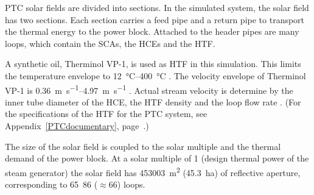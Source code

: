 PTC solar fields are divided into sections. In the simulated system, the solar field has two sections. Each section carries a feed pipe and a return pipe to transport the thermal energy to the power block. Attached to the header pipes are many loops, which contain the SCAs, the HCEs and the HTF. 

A synthetic oil, Therminol VP-1, is used as HTF in this simulation. This limits the temperature envelope to \SIrange{12}{400}{\celsius} \cite{Therminol2015}. The velocity envelope of Therminol VP-1 is \SIrange{0.36}{4.97}{\meter\per\second} \cite{Wagner2014}. Actual stream velocity is determine by the inner tube diameter of the HCE, the HTF density and the loop flow rate \cite{NREL2015a}. (For the specifications of the HTF for the PTC system, see Appendix~\ref{PTCdocumentary}, page~\pageref{PTC_HTF}.) 


The size of the solar field is coupled to the solar multiple and the thermal demand of the power block. At a solar multiple of \si{1} (design thermal power of the steam generator) the solar field has \SI{453003}{\square\metre} (\SI{45.3}{\hectare}) of reflective aperture, corresponding to \si{65.86} ($\approx$66) loops.


